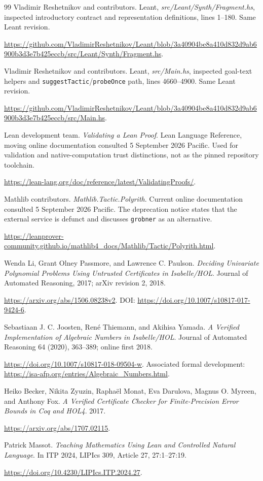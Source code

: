 \documentclass[11pt,a4paper]{article}
\newcommand{\code}[1]{\nolinkurl{#1}}
\theoremstyle{definition}
\begin{document}
\begin{thebibliography}{99}
 Vladimir Reshetnikov and contributors. Leant, \emph{src/Leant/Synth/Fragment.hs}, inspected introductory contract and representation definitions, lines 1--180. Same Leant revision.\par
\url{https://github.com/VladimirReshetnikov/Leant/blob/3a40904be8a410d832d9ab6900b3d3e7b425eccb/src/Leant/Synth/Fragment.hs}.

 Vladimir Reshetnikov and contributors. Leant, \emph{src/Main.hs}, inspected goal-text helpers and \code{suggestTactic}/\code{probeOnce} path, lines 4660--4900. Same Leant revision.\par
\url{https://github.com/VladimirReshetnikov/Leant/blob/3a40904be8a410d832d9ab6900b3d3e7b425eccb/src/Main.hs}.

 Lean development team. \emph{Validating a Lean Proof}. Lean Language Reference, moving online documentation consulted 5 September 2026 Pacific. Used for validation and native-computation trust distinctions, not as the pinned repository toolchain.\par
\url{https://lean-lang.org/doc/reference/latest/ValidatingProofs/}.

 Mathlib contributors. \emph{Mathlib.Tactic.Polyrith}. Current online documentation consulted 5 September 2026 Pacific. The deprecation notice states that the external service is defunct and discusses \code{grobner} as an alternative.\par
\url{https://leanprover-community.github.io/mathlib4_docs/Mathlib/Tactic/Polyrith.html}.

 Wenda Li, Grant Olney Passmore, and Lawrence C. Paulson. \emph{Deciding Univariate Polynomial Problems Using Untrusted Certificates in Isabelle/HOL}. Journal of Automated Reasoning, 2017; arXiv revision 2, 2018.\par
\url{https://arxiv.org/abs/1506.08238v2}. DOI: \url{https://doi.org/10.1007/s10817-017-9424-6}.

 Sebastiaan J. C. Joosten, Ren\'e Thiemann, and Akihisa Yamada. \emph{A Verified Implementation of Algebraic Numbers in Isabelle/HOL}. Journal of Automated Reasoning 64 (2020), 363--389; online first 2018.\par
\url{https://doi.org/10.1007/s10817-018-09504-w}. Associated formal development: \url{https://isa-afp.org/entries/Algebraic_Numbers.html}.

 Heiko Becker, Nikita Zyuzin, Rapha\"el Monat, Eva Darulova, Magnus O. Myreen, and Anthony Fox. \emph{A Verified Certificate Checker for Finite-Precision Error Bounds in Coq and HOL4}. 2017.\par
\url{https://arxiv.org/abs/1707.02115}.

 Patrick Massot. \emph{Teaching Mathematics Using Lean and Controlled Natural Language}. In ITP 2024, LIPIcs 309, Article 27, 27:1--27:19.\par
\url{https://doi.org/10.4230/LIPIcs.ITP.2024.27}.

\end{thebibliography}
\end{document}
